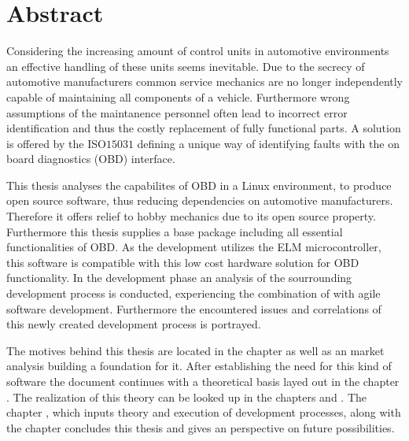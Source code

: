 

\chapter*{Abstract}
\label{cha:abstract}

Considering the increasing amount of control units in automotive environments an effective handling of these units seems inevitable. Due to the secrecy 
of automotive manufacturers common service mechanics are no longer independently capable of maintaining all components of a vehicle. Furthermore wrong assumptions of the 
maintanence personnel often lead to incorrect error identification and thus the costly replacement of fully functional parts. A solution is offered by 
the ISO$15031$ defining a unique way of identifying faults with the on board diagnostics (OBD) interface.

This thesis analyses the capabilites of OBD in a Linux environment, to produce open source software, thus reducing dependencies on automotive manufacturers. 
Therefore it offers relief to hobby mechanics due to its open source property. Furthermore this thesis supplies a base package including all essential 
functionalities of OBD. As the development utilizes the ELM microcontroller, this software is compatible with this low cost hardware solution for OBD functionality. 
In the development phase an analysis of the sourrounding development process is conducted, experiencing the combination of  with agile software 
development. Furthermore the encountered issues and correlations of this newly created development process is portrayed.

The motives behind this thesis are located in the chapter  as well as an market analysis building a foundation for it. After establishing the 
need for this kind of software the document continues with a theoretical basis layed out in the chapter . The realization of this theory can 
be looked up in the chapters  and . The chapter , which inputs theory and 
execution of development processes, along with the  chapter concludes this thesis and gives an perspective on future possibilities.

